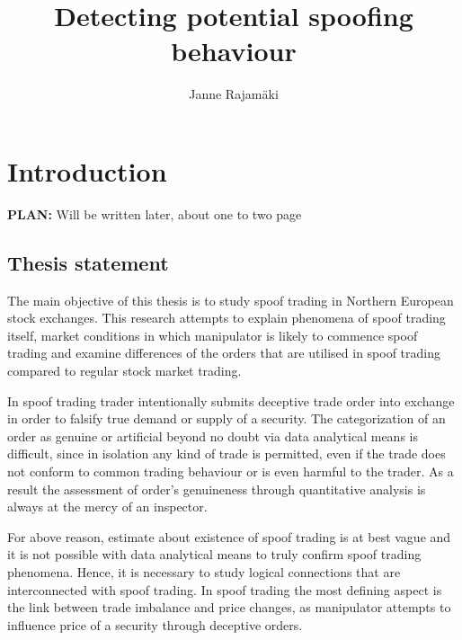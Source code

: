 \documentclass{tut-thesis}
\author 		{Janne Rajamäki}
\title 		[Potentiaalisten valekauppojen tunnistaminen]
			{Detecting potential spoofing behaviour}
\date 		{\Today}		%
\begin{document}
\maketitle

\frontmatter
\begin{abstract}
	\blindtext
\end{abstract}

\begin{otherlanguage}{finnish}
\begin{abstract}
\end{abstract}
\end{otherlanguage}

\tableofcontents


\mainmatter
\chapter{Introduction}
\textbf{PLAN:} Will be written later, about one to two page 

\section{Thesis statement}
The main objective of this thesis is to study spoof trading in Northern European stock exchanges. This research attempts to explain phenomena of spoof trading itself, market conditions in which manipulator is likely to commence spoof trading and examine differences of the orders that are utilised in spoof trading compared to regular stock market trading. 

In spoof trading trader intentionally submits deceptive trade order into exchange in order to falsify true demand or supply of a security. The categorization of an order as genuine or artificial beyond no doubt via data analytical means is difficult, since in isolation any kind of trade is permitted, even if the trade does not conform to common trading behaviour or is even harmful to the trader. As a result the assessment of order's genuineness through quantitative analysis is always at the mercy of an inspector.

For above reason, estimate about existence of spoof trading is at best vague and it is not possible with data analytical means to truly confirm spoof trading phenomena. Hence, it is necessary to study logical connections that are interconnected with spoof trading. In spoof trading the most defining aspect is the link between trade imbalance and price changes, as manipulator attempts to influence price of a security through deceptive orders.
\end{document}
